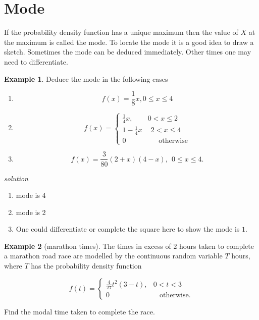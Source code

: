 \documentclass[
]{book}
\theoremstyle{definition}
\theoremstyle{definition}
\newtheorem{example}{Example}[chapter]
\theoremstyle{definition}
\theoremstyle{definition}
\theoremstyle{remark}
\begin{document}
\hypertarget{mode}{%
\section{Mode}\label{mode}}

If the probability density function has a unique maximum then the value of \(X\) at the maximum is called the mode. To locate the mode it is a good idea to draw a sketch. Sometimes the mode can be deduced immediately. Other times one may need to differentiate.

\begin{example}

Deduce the mode in the following cases

\begin{enumerate}
\def\labelenumi{\alph{enumi})}
\item
  \[f(x) = \frac{1}{8}x , 0\leq x \leq 4\]
\item
  \begin{equation*}
    f(x)=\begin{cases}
   \frac{1}{4}x, &  0< x \leq 2 \\
   1-\frac{1}{4}x & \ \  2< x \leq 4 \\
   0& \ \ \ \ \  \ \ \text{otherwise}
    \end{cases}
  \end{equation*}
\item
  \[f(x) = \frac{3}{80}(2+x)(4-x) , \ \  0\leq x \leq 4.\]
\end{enumerate}

\emph{solution}

\begin{enumerate}
\def\labelenumi{\alph{enumi})}
\item
  mode is 4
\item
  mode is 2
\item
  One could differentiate or complete the square here to show the mode is \(1\).
\end{enumerate}

\end{example}

\begin{example}[marathon times]
The times in excess of \(2\) hours taken to complete a marathon road race are modelled by the continuous random variable \(T\) hours, where \(T\) has the probability density function

\begin{equation*}
  f(t)=\begin{cases}
    \frac{4}{27}t^2(3-t), &  0< t < 3\\
    0 & \ \ \ \  \text{otherwise}.
  \end{cases}
\end{equation*}

Find the modal time taken to complete the race.
\end{example}
\end{document}
